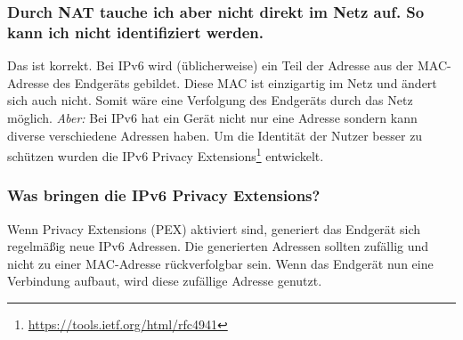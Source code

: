 \documentclass[10pt,a4paper,oneside]{scrartcl}
\begin{document}
\subsubsection*{Durch NAT tauche ich aber nicht direkt im Netz auf. So kann ich nicht identifiziert werden.}
Das ist korrekt. Bei IPv6 wird (üblicherweise) ein Teil der Adresse aus der MAC-Adresse des Endgeräts gebildet. Diese MAC ist einzigartig im Netz und ändert sich auch nicht. Somit wäre eine Verfolgung des Endgeräts durch das Netz möglich.
\emph{Aber: }Bei IPv6 hat ein Gerät nicht nur eine Adresse sondern kann diverse verschiedene Adressen haben.
Um die Identität der Nutzer besser zu schützen wurden die IPv6 Privacy Extensions\footnote{\url{https://tools.ietf.org/html/rfc4941}} entwickelt.

\subsubsection*{Was bringen die IPv6 Privacy Extensions?}
Wenn Privacy Extensions (PEX) aktiviert sind, generiert das Endgerät sich regelmäßig
neue IPv6 Adressen. Die generierten Adressen sollten zufällig und nicht zu einer MAC-Adresse rückverfolgbar sein. Wenn das Endgerät nun eine Verbindung aufbaut, wird diese zufällige Adresse genutzt.
\end{document}
